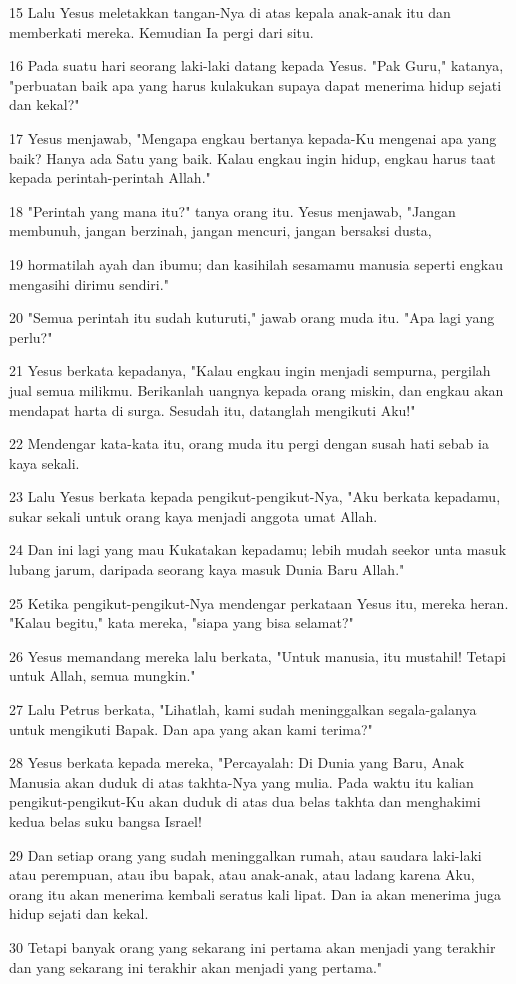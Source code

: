 \par 15 Lalu Yesus meletakkan tangan-Nya di atas kepala anak-anak itu dan memberkati mereka. Kemudian Ia pergi dari situ.
\par 16 Pada suatu hari seorang laki-laki datang kepada Yesus. "Pak Guru," katanya, "perbuatan baik apa yang harus kulakukan supaya dapat menerima hidup sejati dan kekal?"
\par 17 Yesus menjawab, "Mengapa engkau bertanya kepada-Ku mengenai apa yang baik? Hanya ada Satu yang baik. Kalau engkau ingin hidup, engkau harus taat kepada perintah-perintah Allah."
\par 18 "Perintah yang mana itu?" tanya orang itu. Yesus menjawab, "Jangan membunuh, jangan berzinah, jangan mencuri, jangan bersaksi dusta,
\par 19 hormatilah ayah dan ibumu; dan kasihilah sesamamu manusia seperti engkau mengasihi dirimu sendiri."
\par 20 "Semua perintah itu sudah kuturuti," jawab orang muda itu. "Apa lagi yang perlu?"
\par 21 Yesus berkata kepadanya, "Kalau engkau ingin menjadi sempurna, pergilah jual semua milikmu. Berikanlah uangnya kepada orang miskin, dan engkau akan mendapat harta di surga. Sesudah itu, datanglah mengikuti Aku!"
\par 22 Mendengar kata-kata itu, orang muda itu pergi dengan susah hati sebab ia kaya sekali.
\par 23 Lalu Yesus berkata kepada pengikut-pengikut-Nya, "Aku berkata kepadamu, sukar sekali untuk orang kaya menjadi anggota umat Allah.
\par 24 Dan ini lagi yang mau Kukatakan kepadamu; lebih mudah seekor unta masuk lubang jarum, daripada seorang kaya masuk Dunia Baru Allah."
\par 25 Ketika pengikut-pengikut-Nya mendengar perkataan Yesus itu, mereka heran. "Kalau begitu," kata mereka, "siapa yang bisa selamat?"
\par 26 Yesus memandang mereka lalu berkata, "Untuk manusia, itu mustahil! Tetapi untuk Allah, semua mungkin."
\par 27 Lalu Petrus berkata, "Lihatlah, kami sudah meninggalkan segala-galanya untuk mengikuti Bapak. Dan apa yang akan kami terima?"
\par 28 Yesus berkata kepada mereka, "Percayalah: Di Dunia yang Baru, Anak Manusia akan duduk di atas takhta-Nya yang mulia. Pada waktu itu kalian pengikut-pengikut-Ku akan duduk di atas dua belas takhta dan menghakimi kedua belas suku bangsa Israel!
\par 29 Dan setiap orang yang sudah meninggalkan rumah, atau saudara laki-laki atau perempuan, atau ibu bapak, atau anak-anak, atau ladang karena Aku, orang itu akan menerima kembali seratus kali lipat. Dan ia akan menerima juga hidup sejati dan kekal.
\par 30 Tetapi banyak orang yang sekarang ini pertama akan menjadi yang terakhir dan yang sekarang ini terakhir akan menjadi yang pertama."

